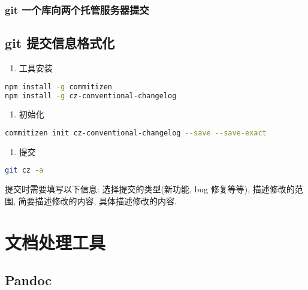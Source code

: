 \subsubsection{git
一个库向两个托管服务器提交}\label{git-ux4e00ux4e2aux5e93ux5411ux4e24ux4e2aux6258ux7ba1ux670dux52a1ux5668ux63d0ux4ea4}

\subsection{git
提交信息格式化}\label{git-ux63d0ux4ea4ux4fe1ux606fux683cux5f0fux5316}

\begin{enumerate}
\def\labelenumi{\arabic{enumi}.}
\tightlist
\item
  工具安装
\end{enumerate}

\begin{lstlisting}[language=bash]
npm install -g commitizen
npm install -g cz-conventional-changelog
\end{lstlisting}

\begin{enumerate}
\def\labelenumi{\arabic{enumi}.}
\setcounter{enumi}{1}
\tightlist
\item
  初始化
\end{enumerate}

\begin{lstlisting}[language=bash]
commitizen init cz-conventional-changelog --save --save-exact
\end{lstlisting}

\begin{enumerate}
\def\labelenumi{\arabic{enumi}.}
\setcounter{enumi}{2}
\tightlist
\item
  提交
\end{enumerate}

\begin{lstlisting}[language=bash]
git cz -a
\end{lstlisting}

提交时需要填写以下信息: 选择提交的类型(新功能, bug 修复等等),
描述修改的范围, 简要描述修改的内容, 具体描述修改的内容.

\section{文档处理工具}\label{ux6587ux6863ux5904ux7406ux5de5ux5177}

\subsection{Pandoc}\label{pandoc}

